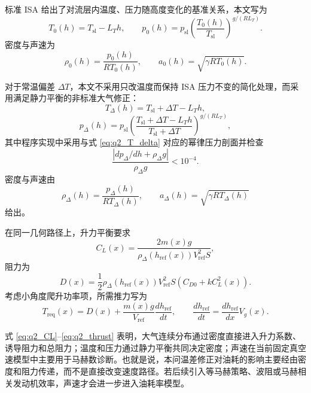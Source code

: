 \documentclass[withoutpreface,bwprint]{cumcmthesis}
\begin{document}
标准 ISA 给出了对流层内温度、压力随高度变化的基准关系\cite{icao_atmos}，本文写为
\begin{equation}
T_0(h)=T_{\mathrm{sl}}-L_T h,\qquad
p_0(h)=p_{\mathrm{sl}}\left(\frac{T_0(h)}{T_{\mathrm{sl}}}\right)^{g/(R L_T)}.
\end{equation}
密度与声速为
\begin{equation}
\rho_0(h)=\frac{p_0(h)}{R T_0(h)},\qquad
a_0(h)=\sqrt{\gamma R T_0(h)}.
\end{equation}

对于常温偏差 $\Delta T$，本文不采用只改温度而保持 ISA 压力不变的简化处理，而采用满足静力平衡的非标准大气修正：
\begin{equation}
T_\Delta(h)=T_{\mathrm{sl}}+\Delta T-L_T h,
\label{eq:q2_T_delta}
\end{equation}
\begin{equation}
p_\Delta(h)=p_{\mathrm{sl}}
\left(\frac{T_{\mathrm{sl}}+\Delta T-L_T h}{T_{\mathrm{sl}}+\Delta T}\right)^{g/(R L_T)},
\label{eq:q2_p_delta}
\end{equation}
其中程序实现中采用与式 \eqref{eq:q2_T_delta} 对应的幂律压力剖面并检查
\begin{equation}
\frac{|dp_\Delta/dh+\rho_\Delta g|}{\rho_\Delta g}<10^{-4}.
\end{equation}
密度与声速由
\begin{equation}
\rho_\Delta(h)=\frac{p_\Delta(h)}{R T_\Delta(h)},\qquad
a_\Delta(h)=\sqrt{\gamma R T_\Delta(h)}
\end{equation}
给出。

在同一几何路径上，升力平衡要求
\begin{equation}
C_L(x)=\frac{2m(x)g}{\rho_\Delta(h_{\mathrm{ref}}(x))V_{\mathrm{ref}}^2S},
\label{eq:q2_CL}
\end{equation}
阻力为
\begin{equation}
D(x)=\frac{1}{2}\rho_\Delta(h_{\mathrm{ref}}(x))V_{\mathrm{ref}}^2S
\left(C_{D0}+kC_L^2(x)\right).
\label{eq:q2_drag}
\end{equation}
考虑小角度爬升功率项，所需推力写为
\begin{equation}
T_{\mathrm{req}}(x)=D(x)+\frac{m(x)g}{V_{\mathrm{ref}}}\frac{dh_{\mathrm{ref}}}{dt},
\qquad
\frac{dh_{\mathrm{ref}}}{dt}=\frac{dh_{\mathrm{ref}}}{dx}V_g(x).
\label{eq:q2_thrust}
\end{equation}

式 \eqref{eq:q2_CL}--\eqref{eq:q2_thrust} 表明，大气连续分布通过密度直接进入升力系数、诱导阻力和总阻力；温度和压力通过静力平衡共同决定密度；声速在当前固定真空速模型中主要用于马赫数诊断。也就是说，本问温差修正对油耗的影响主要经由密度和阻力传递，而不是直接改变速度路径。若后续引入等马赫策略、波阻或马赫相关发动机效率，声速才会进一步进入油耗率模型。
\end{document}
